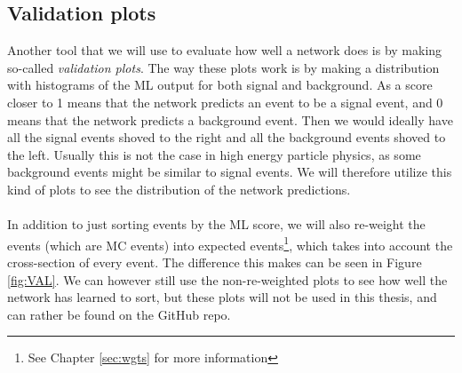 \documentclass[12pt, a4paper]{book}
\begin{document}
\subsection{Validation plots}\label{sec:validation}
Another tool that we will use to evaluate how well a network does is by making so-called \textit{validation plots}. The way these plots work is by making a distribution with histograms of the ML output for both signal and background. As a score closer to 1 means that the network predicts an event to be a signal event, and 0 means that the network predicts a background event. Then we would ideally have all the signal events shoved to the right and all the background events shoved to the left. 
Usually this is not the case in high energy particle physics, as some background events might be similar to signal events. We will therefore utilize this kind of plots to see the distribution of the network predictions. \\
\\In addition to just sorting events by the ML score, we will also re-weight the events (which are MC events) into expected events\footnote{See Chapter \ref{sec:wgts} for more information}, which takes into account the cross-section of every event. The difference this makes can be seen in Figure \ref{fig:VAL}. We can however still use the non-re-weighted plots to see how well the network has learned to sort, but these plots will not be 
used in this thesis, and can rather be found on the GitHub repo. \\
\end{document}

